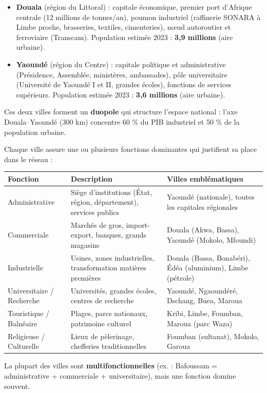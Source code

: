 \documentclass[11pt]{article}
\begin{document}
\begin{exemplebox}
\begin{itemize}
\item \textbf{Douala} (région du Littoral) : capitale économique, premier port d'Afrique centrale (12 millions de tonnes/an), poumon industriel (raffinerie SONARA à Limbe proche, brasseries, textiles, cimenteries), nœud autoroutier et ferroviaire (Transcam). Population estimée 2023 : \textbf{3,9 millions} (aire urbaine).
\item \textbf{Yaoundé} (région du Centre) : capitale politique et administrative (Présidence, Assemblée, ministères, ambassades), pôle universitaire (Université de Yaoundé I et II, grandes écoles), fonctions de services supérieurs. Population estimée 2023 : \textbf{3,6 millions} (aire urbaine).
\end{itemize}
Ces deux villes forment un \textbf{duopole} qui structure l'espace national : l'axe Douala–Yaoundé (300 km) concentre 60 \% du PIB industriel et 50 \% de la population urbaine.
\end{exemplebox}

\begin{propriete}
Chaque ville assure une ou plusieurs fonctions dominantes qui justifient sa place dans le réseau :
\begin{center}
\begin{tabularx}{\linewidth}{|l|X|X|}\hline
\textbf{Fonction} & \textbf{Description} & \textbf{Villes emblématiques} \\ \hline
Administrative & Siège d'institutions (État, région, département), services publics & Yaoundé (nationale), toutes les capitales régionales \\ \hline
Commerciale & Marchés de gros, import-export, banques, grands magasins & Douala (Akwa, Bassa), Yaoundé (Mokolo, Mfoundi) \\ \hline
Industrielle & Usines, zones industrielles, transformation matières premières & Douala (Bassa, Bonabéri), Édéa (aluminium), Limbe (pétrole) \\ \hline
Universitaire / Recherche & Universités, grandes écoles, centres de recherche & Yaoundé, Ngaoundéré, Dschang, Buea, Maroua \\ \hline
Touristique / Balnéaire & Plages, parcs nationaux, patrimoine culturel & Kribi, Limbe, Foumban, Maroua (parc Waza) \\ \hline
Religieuse / Culturelle & Lieux de pèlerinage, chefferies traditionnelles & Foumban (sultanat), Mokolo, Garoua \\ \hline
\end{tabularx}
\end{center}
La plupart des villes sont \textbf{multifonctionnelles} (ex. : Bafoussam = administrative + commerciale + universitaire), mais une fonction domine souvent.
\end{propriete}
\end{document}
